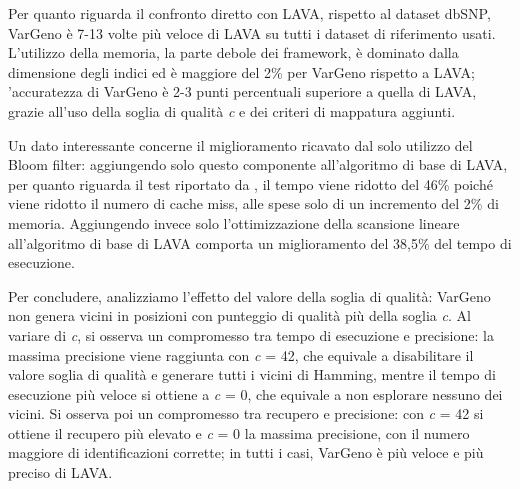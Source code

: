 \documentclass[../main.tex]{subfiles}
\begin{document}
Per quanto riguarda il confronto diretto con LAVA, rispetto al dataset dbSNP, VarGeno è 7-13 volte più veloce di LAVA su tutti i dataset di riferimento usati. L'utilizzo della memoria, la parte debole dei framework, è dominato dalla dimensione degli indici ed è maggiore del 2\% per VarGeno rispetto a LAVA; 'accuratezza di VarGeno è 2-3 punti percentuali superiore a quella di LAVA, grazie all’uso della soglia di qualità \textit{c} e dei criteri di mappatura aggiunti. 

Un dato interessante concerne il miglioramento ricavato dal solo utilizzo del Bloom filter: aggiungendo solo questo componente all’algoritmo di base di LAVA, per quanto riguarda il test riportato da \cite{sun-medvedev2018vargeno}, il tempo viene ridotto del 46\% poiché viene ridotto il numero di cache miss, alle spese solo di un incremento del 2\% di memoria. Aggiungendo invece solo l’ottimizzazione della scansione lineare all’algoritmo di base di LAVA comporta un miglioramento del 38,5\% del tempo di esecuzione. 

Per concludere, analizziamo l’effetto del valore della soglia di qualità: VarGeno non genera vicini in posizioni con punteggio di qualità più della soglia \textit{c}. Al variare di \textit{c}, si osserva un compromesso tra tempo di esecuzione e precisione: la massima precisione viene raggiunta con \textit{c} = 42, che equivale a disabilitare il valore soglia di qualità e generare tutti i vicini di Hamming, mentre il tempo di esecuzione più veloce si ottiene a \textit{c} = 0, che equivale a non esplorare nessuno dei vicini. Si osserva poi un compromesso tra recupero e precisione: con \textit{c} = 42 si ottiene il recupero più elevato e \textit{c} = 0 la massima precisione, con il numero maggiore di identificazioni corrette; in tutti i casi, VarGeno è più veloce e più preciso di LAVA. 
\end{document}
